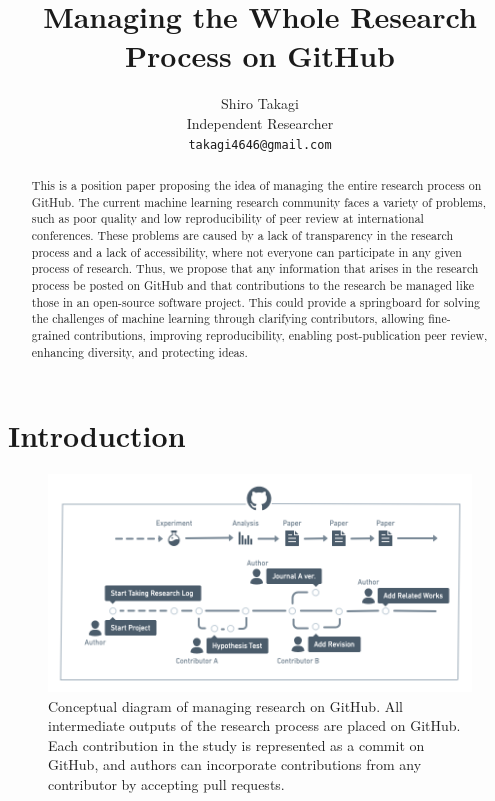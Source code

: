 \documentclass{article}
\title{Managing the Whole Research Process on GitHub}
\author{%
  Shiro Takagi \\
  Independent Researcher\\
  \texttt{takagi4646@gmail.com}
}
\begin{document}
\maketitle


\begin{abstract}
  This is a position paper proposing the idea of managing the entire research process on GitHub. The current machine learning research community faces a variety of problems, such as poor quality and low reproducibility of peer review at international conferences. These problems are caused by a lack of transparency in the research process and a lack of accessibility, where not everyone can participate in any given process of research. Thus, we propose that any information that arises in the research process be posted on GitHub and that contributions to the research be managed like those in an open-source software project. This could provide a springboard for solving the challenges of machine learning through clarifying contributors, allowing fine-grained contributions, improving reproducibility, enabling post-publication peer review, enhancing diversity, and protecting ideas.
\end{abstract}


\section{Introduction}

\begin{figure}[htb]
    \centering
    \includegraphics[width=\linewidth]{figs/GitHubResearchManagement.png}
    \caption{Conceptual diagram of managing research on GitHub. All intermediate outputs of the research process are placed on GitHub. Each contribution in the study is represented as a commit on GitHub, and authors can incorporate contributions from any contributor by accepting pull requests.}
    \label{fig:conceptual_diagram}
\end{figure}
\end{document}
